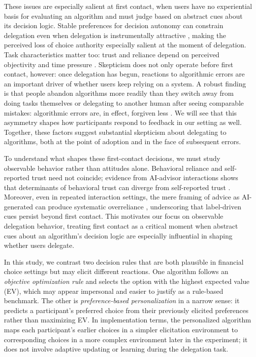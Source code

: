 \documentclass[a4paper, 12pt, fleqn]{article}
\theoremstyle{definition}
\begin{document}
These issues are especially salient at first contact, when users have no experiential basis for evaluating an algorithm and must judge based on abstract cues about its decision logic. Stable preferences for decision autonomy can constrain delegation even when delegation is instrumentally attractive \citep{Ivanova-Stenzel2025}, making the perceived loss of choice authority especially salient at the moment of delegation. Task characteristics matter too: trust and reliance depend on perceived objectivity and time pressure \citep{Yang2025}. Skepticism does not only operate before first contact, however: once delegation has begun, reactions to algorithmic errors are an important driver of whether users keep relying on a system. A robust finding is that people abandon algorithms more readily than they switch away from doing tasks themselves or delegating to another human after seeing comparable mistakes: algorithmic errors are, in effect, forgiven less \citep{Dietvorst2015,Renier2021}. We will see that this asymmetry shapes how participants respond to feedback in our setting as well. Together, these factors suggest substantial skepticism about delegating to algorithms, both at the point of adoption and in the face of subsequent errors.

To understand what shapes these first-contact decisions, we must study observable behavior rather than attitudes alone. Behavioral reliance and self-reported trust need not coincide; evidence from AI-advisor interactions shows that determinants of behavioral trust can diverge from self-reported trust \citep{Schreibelmayr2025}. Moreover, even in repeated interaction settings, the mere framing of advice as AI-generated can produce systematic overreliance \citep{Klingbeil2024}, underscoring that label-driven cues persist beyond first contact. This motivates our focus on observable delegation behavior, treating first contact as a critical moment when abstract cues about an algorithm's decision logic are especially influential in shaping whether users delegate.

In this study, we contrast two decision rules that are both plausible in financial choice settings but may elicit different reactions. One algorithm follows an \emph{objective optimization rule} and selects the option with the highest expected value (EV), which may appear impersonal and easier to justify as a rule-based benchmark. The other is \emph{preference-based personalization} in a narrow sense: it predicts a participant's preferred choice from their previously elicited preferences rather than maximizing EV. In implementation terms, the personalized algorithm maps each participant's earlier choices in a simpler elicitation environment to corresponding choices in a more complex environment later in the experiment; it does not involve adaptive updating or learning during the delegation task.
\end{document}

